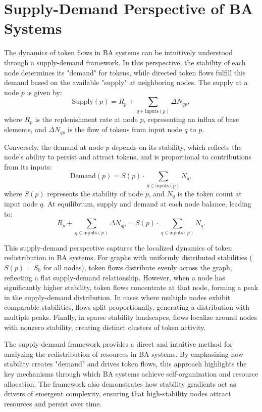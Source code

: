 \documentclass[entropy,article,submit,pdftex,moreauthors]{Definitions/mdpi}
\begin{document}
\section{Supply-Demand Perspective of BA Systems}

The dynamics of token flows in BA systems can be intuitively understood through a supply-demand framework. In this perspective, the stability of each node determines its "demand" for tokens, while directed token flows fulfill this demand based on the available "supply" at neighboring nodes. The supply at a node \( p \) is given by:
\begin{equation}
\text{Supply}(p) = R_p + \sum_{q \in \text{inputs}(p)} \Delta N_{qp},
\end{equation}
where \( R_p \) is the replenishment rate at node \( p \), representing an influx of base elements, and \( \Delta N_{qp} \) is the flow of tokens from input node \( q \) to \( p \). 

Conversely, the demand at node \( p \) depends on its stability, which reflects the node’s ability to persist and attract tokens, and is proportional to contributions from its inputs:
\begin{equation}
\text{Demand}(p) = S(p) \cdot \sum_{q \in \text{inputs}(p)} N_q,
\end{equation}
where \( S(p) \) represents the stability of node \( p \), and \( N_q \) is the token count at input node \( q \). At equilibrium, supply and demand at each node balance, leading to:
\begin{equation}
R_p + \sum_{q \in \text{inputs}(p)} \Delta N_{qp} = S(p) \cdot \sum_{q \in \text{inputs}(p)} N_q.
\end{equation}

This supply-demand perspective captures the localized dynamics of token redistribution in BA systems. For graphs with uniformly distributed stabilities (\( S(p) = S_0 \) for all nodes), token flows distribute evenly across the graph, reflecting a flat supply-demand relationship. However, when a node has significantly higher stability, token flows concentrate at that node, forming a peak in the supply-demand distribution. In cases where multiple nodes exhibit comparable stabilities, flows split proportionally, generating a distribution with multiple peaks. Finally, in sparse stability landscapes, flows localize around nodes with nonzero stability, creating distinct clusters of token activity.

The supply-demand framework provides a direct and intuitive method for analyzing the redistribution of resources in BA systems. By emphasizing how stability creates "demand" and drives token flows, this approach highlights the key mechanisms through which BA systems achieve self-organization and resource allocation. The framework also demonstrates how stability gradients act as drivers of emergent complexity, ensuring that high-stability nodes attract resources and persist over time.
\end{document}
